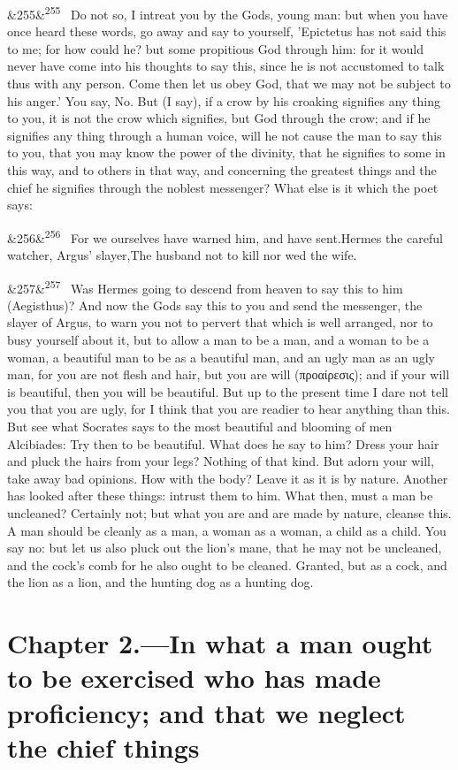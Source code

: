 \documentclass[12pt]{article}
\newcommand{\para}[1][]{\par\noindent\ifx&#1&\else\textsuperscript{\footnotesize #1}~\fi}
\begin{document}
\para[255] Do not so, I intreat you by the Gods, young man: but when you have once heard these words, go away and say to yourself, 'Epictetus has not said this to me; for how could he? but some propitious God through him: for it would never have come into his thoughts to say this, since he is not accustomed to talk thus with any person. Come then let us obey God, that we may not be subject to his anger.' You say, No. But (I say), if a crow by his croaking signifies any thing to you, it is not the crow which signifies, but God through the crow; and if he signifies any thing through a human voice, will he not cause the man to say this to you, that you may know the power of the divinity, that he signifies to some in this way, and to others in that way, and concerning the greatest things and the chief he signifies through the noblest messenger? What else is it which the poet says:

\para[256] For we ourselves have warned him, and have sent.Hermes the careful watcher, Argus' slayer,The husband not to kill nor wed the wife.

\para[257] Was Hermes going to descend from heaven to say this to him (Aegisthus)? And now the Gods say this to you and send the messenger, the slayer of Argus, to warn you not to pervert that which is well arranged, nor to busy yourself about it, but to allow a man to be a man, and a woman to be a woman, a beautiful man to be as a beautiful man, and an ugly man as an ugly man, for you are not flesh and hair, but you are will (προαίρεσις); and if your will is beautiful, then you will be beautiful. But up to the present time I dare not tell you that you are ugly, for I think that you are readier to hear anything than this. But see what Socrates says to the most beautiful and blooming of men Alcibiades: Try then to be beautiful. What does he say to him? Dress your hair and pluck the hairs from your legs? Nothing of that kind. But adorn your will, take away bad opinions. How with the body? Leave it as it is by nature. Another has looked after these things: intrust them to him. What then, must a man be uncleaned? Certainly not; but what you are and are made by nature, cleanse this. A man should be cleanly as a man, a woman as a woman, a child as a child. You say no: but let us also pluck out the lion's mane, that he may not be uncleaned, and the cock's comb for he also ought to be cleaned. Granted, but as a cock, and the lion as a lion, and the hunting dog as a hunting dog.

\section*{Chapter 2.---In what a man ought to be exercised who has made proficiency; and that we neglect the chief things}
\end{document}
